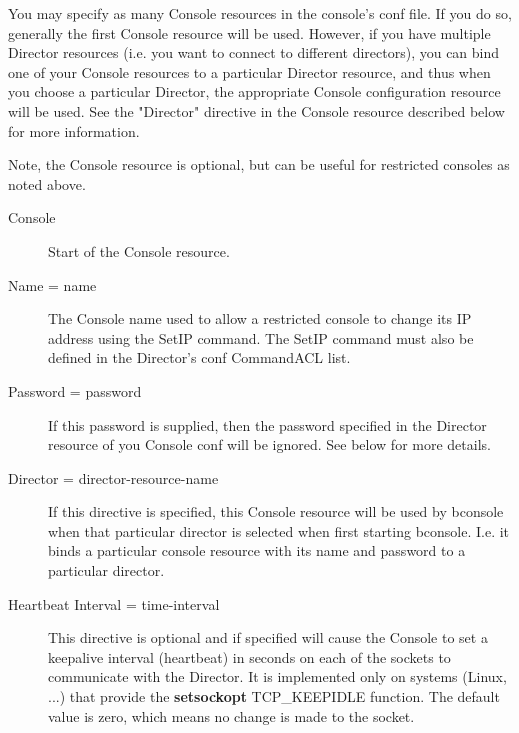 You may specify as many Console resources in the console's conf file. If
you do so, generally the first Console resource will be used.  However, if
you have multiple Director resources (i.e. you want to connect to different
directors), you can bind one of your Console resources to a particular
Director resource, and thus when you choose a particular Director, the
appropriate Console configuration resource will be used. See the "Director"
directive in the Console resource described below for more information.

Note, the Console resource is optional, but can be useful for
restricted consoles as noted above.

\begin{description}
\item [Console]
   Start of the Console resource.

\item [Name = \lt{}name\gt{}]
   The Console name used to allow a restricted console to change
   its IP address using the SetIP command. The SetIP command must
   also be defined in the Director's conf CommandACL list.


\item [Password = \lt{}password\gt{}]
   If this password is supplied, then the password specified in the
   Director resource of you Console conf will be ignored.  See below
   for more details.

\item [Director = \lt{}director-resource-name\gt{}]
   If this directive is specified, this Console resource will be
   used by bconsole when that particular director is selected
   when first starting bconsole.  I.e. it binds a particular console
   resource with its name and password to a particular director.

\item [Heartbeat Interval = \lt{}time-interval\gt{}]
   This directive is optional and if specified will cause the Console to
   set a keepalive interval (heartbeat) in seconds on each of the sockets
   to communicate with the Director.  It is implemented only on systems
   (Linux, ...) that provide the {\bf setsockopt} TCP\_KEEPIDLE function.
   The default value is zero, which means no change is made to the socket.

\end{description}


